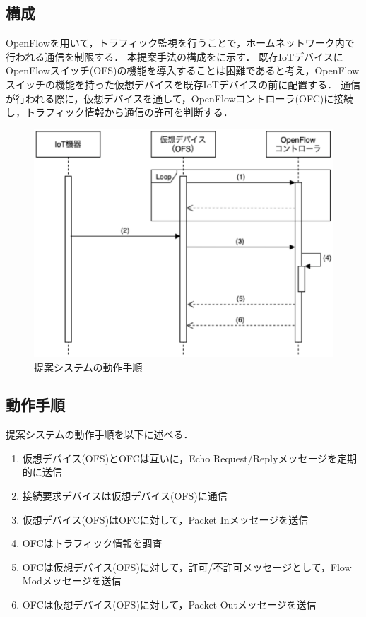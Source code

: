 \documentclass[a4paper,10pt,twocolumn,uplatex]{jsarticle}
\begin{document}
\subsection{構成}
OpenFlowを用いて，トラフィック監視を行うことで，ホームネットワーク内で行われる通信を制限する．
本提案手法の構成をに示す．
既存IoTデバイスにOpenFlowスイッチ(OFS)の機能を導入することは困難であると考え，OpenFlowスイッチの機能を持った仮想デバイスを既存IoTデバイスの前に配置する．
通信が行われる際に，仮想デバイスを通して，OpenFlowコントローラ(OFC)に接続し，トラフィック情報から通信の許可を判断する．

\begin{figure}[!tb]
  \centering
  \includegraphics[width=\linewidth]{img/sequence.eps}
  \caption{提案システムの動作手順}
  \label{fig:sequence}
\end{figure}

\subsection{動作手順}
提案システムの動作手順を以下に述べる．

\begin{enumerate}
  \item 仮想デバイス(OFS)とOFCは互いに，Echo Request/Replyメッセージを定期的に送信
  \item 接続要求デバイスは仮想デバイス(OFS)に通信
  \item 仮想デバイス(OFS)はOFCに対して，Packet Inメッセージを送信
  \item OFCはトラフィック情報を調査
  \item OFCは仮想デバイス(OFS)に対して，許可/不許可メッセージとして，Flow Modメッセージを送信
  \item OFCは仮想デバイス(OFS)に対して，Packet Outメッセージを送信
\end{enumerate}
\end{document}
